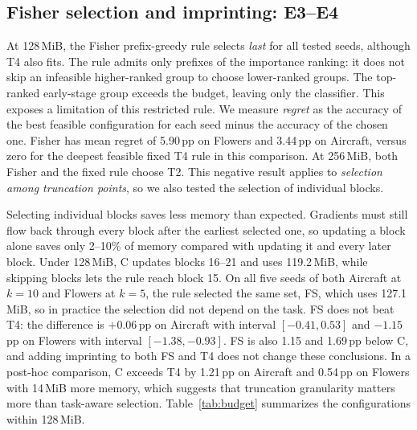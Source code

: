 \documentclass[sigconf,nonacm]{acmart}
\begin{document}
\subsection{Fisher selection and imprinting: E3--E4}
At 128\,MiB, the Fisher prefix-greedy rule selects \emph{last} for all tested seeds, although T4 also fits. The rule admits only prefixes of the importance ranking: it does not skip an infeasible higher-ranked group to choose lower-ranked groups. The top-ranked early-stage group exceeds the budget, leaving only the classifier. This exposes a limitation of this restricted rule. We measure \emph{regret} as the accuracy of the best feasible configuration for each seed minus the accuracy of the chosen one. Fisher has mean regret of 5.90\,pp on Flowers and 3.44\,pp on Aircraft, versus zero for the deepest feasible fixed T4 rule in this comparison. At 256\,MiB, both Fisher and the fixed rule choose T2. This negative result applies to \emph{selection among truncation points}, so we also tested the selection of individual blocks.

Selecting individual blocks saves less memory than expected. Gradients must still flow back through every block after the earliest selected one, so updating a block alone saves only 2--10\% of memory compared with updating it and every later block. Under 128\,MiB, C updates blocks 16--21 and uses 119.2\,MiB, while skipping blocks lets the rule reach block 15. On all five seeds of both Aircraft at $k=10$ and Flowers at $k=5$, the rule selected the same set, FS, which uses 127.1\,MiB, so in practice the selection did not depend on the task. FS does not beat T4: the difference is $+0.06$\,pp on Aircraft with interval $[-0.41,0.53]$ and $-1.15$\,pp on Flowers with interval $[-1.38,-0.93]$. FS is also 1.15 and 1.69\,pp below C, and adding imprinting to both FS and T4 does not change these conclusions. In a post-hoc comparison, C exceeds T4 by 1.21\,pp on Aircraft and 0.54\,pp on Flowers with 14\,MiB more memory, which suggests that truncation granularity matters more than task-aware selection. Table~\ref{tab:budget} summarizes the configurations within 128\,MiB.
\end{document}

